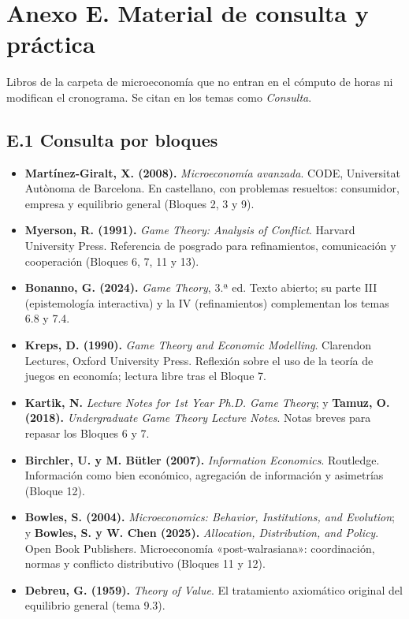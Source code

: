 \documentclass[11pt,a4paper]{article}
\begin{document}
\newpage
\section*{Anexo E. Material de consulta y práctica}

Libros de la carpeta de microeconomía que no entran en el cómputo de horas ni
modifican el cronograma. Se citan en los temas como \emph{Consulta}.

\subsection*{E.1 Consulta por bloques}
{\small
\begin{itemize}[leftmargin=1.4em,itemsep=2pt]
  \item \textbf{Martínez-Giralt, X. (2008).} \emph{Microeconomía avanzada}.
        CODE, Universitat Autònoma de Barcelona. En castellano, con problemas
        resueltos: consumidor, empresa y equilibrio general (Bloques 2, 3 y 9).
  \item \textbf{Myerson, R. (1991).} \emph{Game Theory: Analysis of Conflict}.
        Harvard University Press. Referencia de posgrado para refinamientos,
        comunicación y cooperación (Bloques 6, 7, 11 y 13).
  \item \textbf{Bonanno, G. (2024).} \emph{Game Theory}, 3.ª ed. Texto abierto;
        su parte III (epistemología interactiva) y la IV (refinamientos)
        complementan los temas 6.8 y 7.4.
  \item \textbf{Kreps, D. (1990).} \emph{Game Theory and Economic Modelling}.
        Clarendon Lectures, Oxford University Press. Reflexión sobre el uso de
        la teoría de juegos en economía; lectura libre tras el Bloque 7.
  \item \textbf{Kartik, N.} \emph{Lecture Notes for 1st Year Ph.D. Game
        Theory}; y \textbf{Tamuz, O. (2018).} \emph{Undergraduate Game Theory
        Lecture Notes}. Notas breves para repasar los Bloques 6 y 7.
  \item \textbf{Birchler, U. y M. Bütler (2007).} \emph{Information
        Economics}. Routledge. Información como bien económico, agregación de
        información y asimetrías (Bloque 12).
  \item \textbf{Bowles, S. (2004).} \emph{Microeconomics: Behavior,
        Institutions, and Evolution}; y \textbf{Bowles, S. y W. Chen (2025).}
        \emph{Allocation, Distribution, and Policy}. Open Book Publishers.
        Microeconomía «post-walrasiana»: coordinación, normas y conflicto
        distributivo (Bloques 11 y 12).
  \item \textbf{Debreu, G. (1959).} \emph{Theory of Value}. El tratamiento
        axiomático original del equilibrio general (tema 9.3).
\end{itemize}
}
\end{document}
